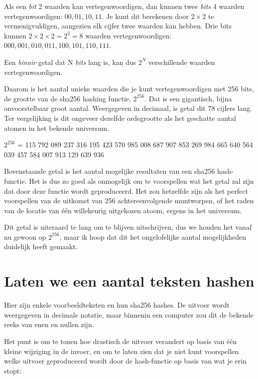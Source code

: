 Als een \textit{bit} 2 waarden kan vertegenwoordigen, dan kunnen twee \textit{bits} 4 waarden vertegenwoordigen: $00, 01, 10, 11$. Je kunt dit berekenen door $2 \times 2$ te vermenigvuldigen, aangezien elk cijfer twee waarden kan hebben. Drie bits kunnen $2 \times 2 \times 2 = 2^3 = 8$ waarden vertegenwoordigen:  $000, 001, 010, 011, 100, 101, 110, 111$.

Een \textit{binair} getal dat N \textit{bits} lang is, kan dus $2^N$ verschillende waarden vertegenwoordigen.

Daarom is het aantal unieke waarden die je kunt vertegenwoordigen met 256 bits, de grootte van de sha256 hashing functie, $2^{256}$. Dat is een gigantisch, bijna onvoorstelbaar groot aantal. Weergegeven in decimaal, is getal dit 78 cijfers lang. Ter vergelijking is dit ongeveer dezelfde ordegrootte als het geschatte aantal atomen in het bekende universum.

  \vspace{\baselineskip}
$2^{256}$ = 115 792 089 237 316 195 423 570 985 008 687 907 853 269 984 665 640 564 039 457 584 007 913 129 639 936
\vspace{\baselineskip} 


Bovenstaande getal is het aantal mogelijke resultaten van een sha256 hash-functie. Het is dus zo goed als onmogelijk om te voorspellen wat het getal zal zijn dat door deze functie wordt geproduceerd. Het zou hetzelfde zijn als het perfect voorspellen van de uitkomst van 256 achtereenvolgende muntworpen, of het raden van de locatie van één willekeurig uitgekozen atoom, ergens in het universum.

Dit getal is uiteraard te lang om te blijven uitschrijven, dus we houden het vanaf nu gewoon op $2^{256}$, maar ik hoop dat dit het ongelofelijke aantal mogelijkheden duidelijk heeft gemaakt.


\section{Laten we een aantal teksten hashen}

Hier zijn enkele voorbeeldteksten en hun sha256 hashes. De uitvoer wordt weergegeven in decimale notatie, maar binnenin een computer zou dit de bekende reeks van enen en nullen zijn.

Het punt is om te tonen hoe drastisch de uitvoer verandert op basis van één kleine wijziging in de invoer, en om te laten zien dat je niet kunt voorspellen welke uitvoer geproduceerd wordt door de hash-functie op basis van wat je erin stopt:

